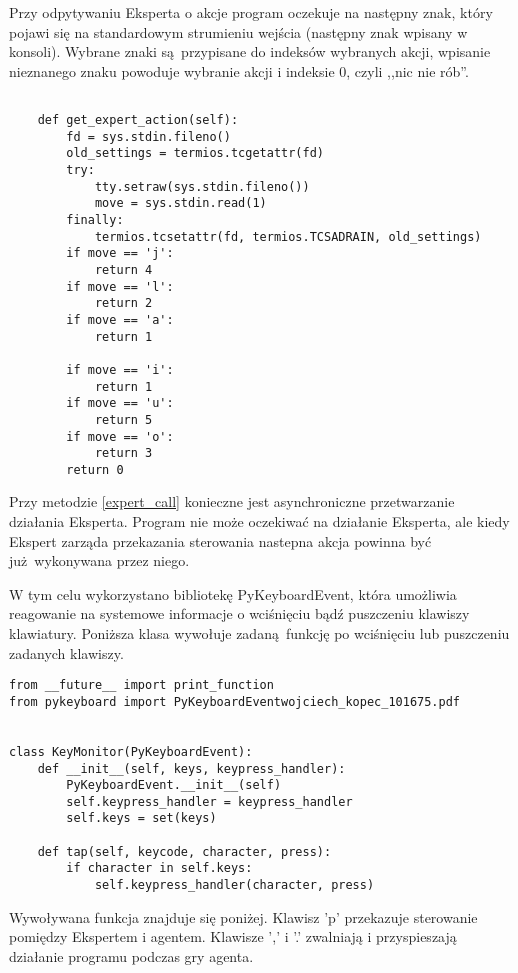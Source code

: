 Przy odpytywaniu Eksperta o akcje program oczekuje na następny znak, który pojawi się na standardowym strumieniu wejścia (następny znak wpisany w konsoli). Wybrane znaki są przypisane do indeksów wybranych akcji, wpisanie nieznanego znaku powoduje wybranie akcji i indeksie 0, czyli ,,nic nie rób''.

\begin{lstlisting}[language=iPython]

    def get_expert_action(self):
        fd = sys.stdin.fileno()
        old_settings = termios.tcgetattr(fd)
        try:
            tty.setraw(sys.stdin.fileno())
            move = sys.stdin.read(1)
        finally:
            termios.tcsetattr(fd, termios.TCSADRAIN, old_settings)
        if move == 'j':
            return 4
        if move == 'l':
            return 2
        if move == 'a':
            return 1

        if move == 'i':
            return 1
        if move == 'u':
            return 5
        if move == 'o':
            return 3
        return 0
\end{lstlisting}

Przy metodzie \ref{expert_call} konieczne jest asynchroniczne przetwarzanie działania Eksperta. Program nie może oczekiwać na działanie Eksperta, ale kiedy Ekspert zarząda przekazania sterowania nastepna akcja powinna być już wykonywana przez niego.

W tym celu wykorzystano bibliotekę PyKeyboardEvent, która umożliwia reagowanie na systemowe informacje o wciśnięciu bądź puszczeniu klawiszy klawiatury. Poniższa klasa wywołuje zadaną funkcję po wciśnięciu lub puszczeniu zadanych klawiszy.


\begin{lstlisting}[language=iPython]
from __future__ import print_function
from pykeyboard import PyKeyboardEventwojciech_kopec_101675.pdf


class KeyMonitor(PyKeyboardEvent):
    def __init__(self, keys, keypress_handler):
        PyKeyboardEvent.__init__(self)
        self.keypress_handler = keypress_handler
        self.keys = set(keys)

    def tap(self, keycode, character, press):
        if character in self.keys:
            self.keypress_handler(character, press)
\end{lstlisting}

Wywoływana funkcja znajduje się poniżej. Klawisz 'p' przekazuje sterowanie pomiędzy Ekspertem i agentem. Klawisze ',' i '.' zwalniają i przyspieszają działanie programu podczas gry agenta.

